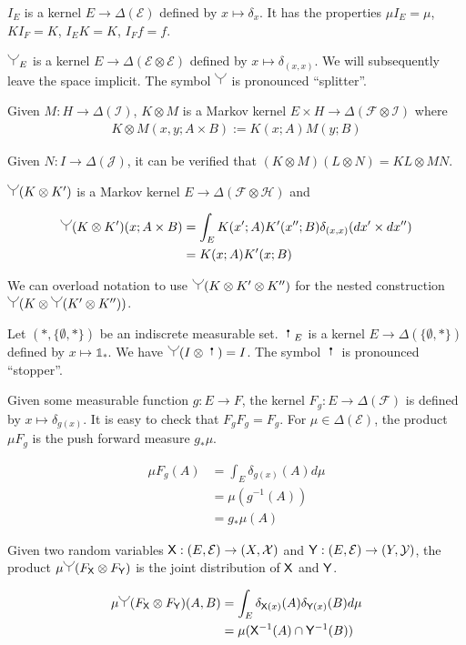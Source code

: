 $I_E$ is a kernel $E\to \Delta(\mathcal{E})$ defined by $x\mapsto \delta_x$. It has the properties $\mu I_E=\mu$, $KI_F = K$, $I_E K = K$, $I_F f=f$.

$\splitter{0.15}_E$ is a kernel $E\to \Delta(\mathcal{E}\otimes\mathcal{E})$ defined by $x\mapsto \delta_{(x,x)}$. We will subsequently leave the space implicit. The symbol $\splitter{0.15}$ is pronounced ``splitter''.

Given $M:H\to \Delta(\mathcal{I})$, $K\otimes M$ is a Markov kernel $E\times H\to \Delta(\mathcal{F}\otimes\mathcal{I})$ where
\begin{align}
    K\otimes M(x,y;A\times B) := K(x;A) M(y;B)
\end{align}

Given $N:I\to \Delta(\mathcal{J})$, it can be verified that $(K\otimes M)(L\otimes N)=KL\otimes MN$.

$\splitter{0.15}(K\otimes K')$ is a Markov kernel $E\to \Delta(\mathcal{F}\otimes\mathcal{H})$ and

\begin{align}
    \splitter{0.15}(K\otimes K')(x;A\times B) &= \int_E K(x';A)K'(x'';B) \delta_{(x,x)} (dx'\times dx'')\\ 
                                              &= K(x;A)K'(x;B) \label{eq:outer_product}
\end{align}

We can overload notation to use $\splitter{0.15}(K\otimes K'\otimes K'')$ for the nested construction $\splitter{0.15}(K\otimes \splitter{0.15}(K'\otimes K''))$. 

Let $(*,\{\emptyset,*\})$ be an indiscrete measurable set. $\stopper{0.15}_E$ is a kernel $E\to \Delta(\{\emptyset,*\})$ defined by $x\mapsto \mathds{1}_*$. We have $\splitter{0.15}(I\otimes \stopper{0.15}) = I$. The symbol $\stopper{0.15}$ is pronounced ``stopper''.

Given some measurable function $g:E\to F$, the kernel $F_g:E\to \Delta(\mathcal{F})$ is defined by $x\mapsto \delta_{g(x)}$. It is easy to check that $F_g F_g = F_g$. For $\mu\in \Delta(\mathcal{E})$, the product $\mu F_g$ is the push forward measure $g_*\mu$.

\begin{align}
    \mu F_g (A) &= \int_E \delta_{g(x)}(A) d\mu\\
                &= \mu(g^{-1}(A))\\
                &= g_*\mu(A)
\end{align}

Given two random variables $\mathsf{X}:(E,\mathcal{E})\to (X,\mathcal{X})$ and $\mathsf{Y}:(E,\mathcal{E})\to (Y,\mathcal{Y})$, the product $\mu\splitter{0.15}(F_{\RV{X}}\otimes F_{\RV{Y}})$ is the joint distribution of $\mathsf{X}$ and $\mathsf{Y}$.

\begin{align}
    \mu \splitter{0.15}(F_{\RV{X}}\otimes F_{\RV{Y}}) (A, B) &= \int_E \delta_{\RV{X}(x)}(A) \delta_{\RV{Y}(x)}(B) d\mu \\
                        &= \mu(\RV{X}^{-1}(A)\cap \RV{Y}^{-1}(B))
\end{align}
